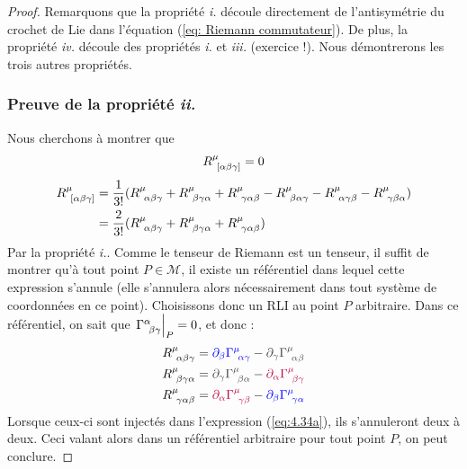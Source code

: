 \begin{proof}
    Remarquons que la propriété \emph{i.} découle directement de l'antisymétrie du crochet de Lie dans l'équation (\ref{eq: Riemann commutateur}). De plus, la propriété \emph{iv.} découle des propriétés \emph{i.} et \emph{iii.} (exercice !). Nous démontrerons les trois autres propriétés.
    \subsubsection{Preuve de la propriété \emph{ii.}}
        Nous cherchons à montrer que 
        \begin{equation*}
            R\indices{^{\mu}_{\![\alpha \beta \gamma]}} = 0
        \end{equation*}
        \begin{align}
            R\indices{^{\mu}_{\![\alpha \beta \gamma]}} &= \frac{1}{3!}(R\indices{^{\mu}_{\!\alpha \beta \gamma}} + R\indices{^{\mu}_{\!\beta \gamma \alpha }} + R\indices{^{\mu}_{\!\gamma \alpha \beta}} - R\indices{^{\mu}_{\!\beta \alpha \gamma }} - R\indices{^{\mu}_{\!\alpha \gamma \beta} }- R\indices{^{\mu}_{\! \gamma \beta \alpha}})\\
            \label{eq:4.34a}
            &= \frac{2}{3!}(R\indices{^{\mu}_{\!\alpha \beta \gamma}} + R\indices{^{\mu}_{\!\beta \gamma \alpha}} + R\indices{^{\mu}_{\!\gamma \alpha \beta}})
        \end{align}
        Par la propriété \emph{i.}. Comme le tenseur de Riemann est un tenseur, il suffit de montrer qu'à tout point $P\in \mathcal{M}$, il existe un référentiel dans lequel cette expression s'annule (elle s'annulera alors nécessairement dans tout système de coordonnées en ce point). Choisissons donc un RLI au point $P$ arbitraire. Dans ce référentiel, on sait que $\atP{\Gamma\indices{^{\alpha}_{\!\beta \gamma}}} =0$, et donc :
        \begin{align}
        \nonumber
            &R\indices{^{\mu}_{\!\alpha \beta \gamma}}= \textcolor{blue}{\partial_{\beta}\Gamma\indices{^{\mu}_{\!\alpha \gamma}}} - \textcolor{darkgray}{\partial_{\gamma}\Gamma\indices{^{\mu}_{\!\alpha \beta}}}\\
            &R\indices{^{\mu}_{\!\beta \gamma \alpha}}= \textcolor{darkgray}{\partial_{\gamma}\Gamma\indices{^{\mu}_{\!\beta \alpha }}} - \textcolor{purple}{\partial_{\alpha}\Gamma\indices{^{\mu}_{\!\beta \gamma}}}\\
            \nonumber
            &R\indices{^{\mu}_{\!\gamma \alpha \beta}} =\textcolor{purple}{\partial_{\alpha}\Gamma\indices{^{\mu}_{\!\gamma \beta}}} - \textcolor{blue}{\partial_{\beta}\Gamma\indices{^{\mu}_{\! \gamma \alpha}}}
        \end{align}
        Lorsque ceux-ci sont injectés dans l'expression (\ref{eq:4.34a}), ils s'annuleront deux à deux. Ceci valant alors dans un référentiel arbitraire pour tout point $P$, on peut conclure.

\end{proof}

